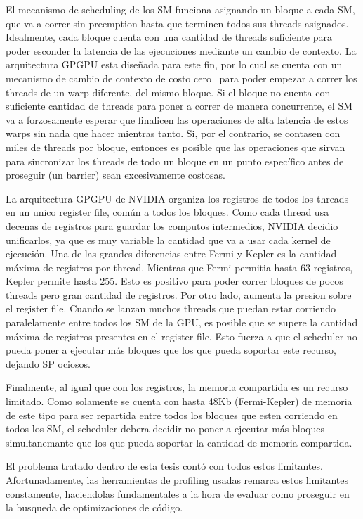 El mecanismo de scheduling de los SM funciona asignando un bloque a cada SM, que
va a correr sin preemption hasta que terminen todos sus threads asignados. Idealmente, cada
bloque cuenta con una cantidad de threads suficiente para poder esconder la latencia
de las ejecuciones mediante un cambio de contexto. La arquitectura GPGPU esta dise\~nada
para este fin, por lo cual se cuenta con un mecanismo de cambio de contexto de costo cero~\cite{NvidiaFermi} para
poder empezar a correr los threads de un warp diferente, del mismo bloque.
Si el bloque no cuenta con suficiente cantidad de threads para poner a correr de manera
concurrente, el SM va a forzosamente esperar que finalicen las operaciones de alta latencia
de estos warps sin nada que hacer mientras tanto. Si, por el contrario, se contasen con
miles de threads por bloque, entonces es posible que las operaciones que sirvan
para sincronizar los threads de todo un bloque en un punto espec\'ifico antes de proseguir
(un barrier) sean excesivamente costosas.

La arquitectura GPGPU de NVIDIA organiza los registros de todos los threads en un unico
register file, com\'un a todos los bloques. Como cada thread usa decenas de registros para guardar
los computos intermedios, NVIDIA decidio unificarlos, ya que es muy variable la cantidad que va a usar
cada kernel de ejecuci\'on. Una de las grandes diferencias entre Fermi y Kepler es la cantidad m\'axima de
registros por thread. Mientras que Fermi permitia hasta 63 registros, Kepler permite hasta 255. Esto
es positivo para poder correr bloques de pocos threads pero gran cantidad de registros. Por otro lado,
aumenta la presion sobre el register file. Cuando se lanzan muchos threads
que puedan estar corriendo paralelamente entre todos los SM de la GPU, es posible que se supere
la cantidad m\'axima de registros presentes en el register file. Esto fuerza a que el scheduler
no pueda poner a ejecutar m\'as bloques que los que pueda soportar este recurso, dejando SP ociosos.

Finalmente, al igual que con los registros, la memoria compartida es un recurso limitado. Como
solamente se cuenta con hasta 48Kb (Fermi-Kepler) de memoria de este tipo para ser repartida entre
todos los bloques que esten corriendo en todos los SM, el scheduler debera decidir no poner a ejecutar
m\'as bloques simultanemante que los que pueda soportar la cantidad de memoria compartida.

El problema tratado dentro de esta tesis cont\'o con todos estos limitantes. Afortunadamente,
las herramientas de profiling usadas remarca estos limitantes constamente, haciendolas
fundamentales a la hora de evaluar como proseguir en la busqueda de optimizaciones de c\'odigo.

